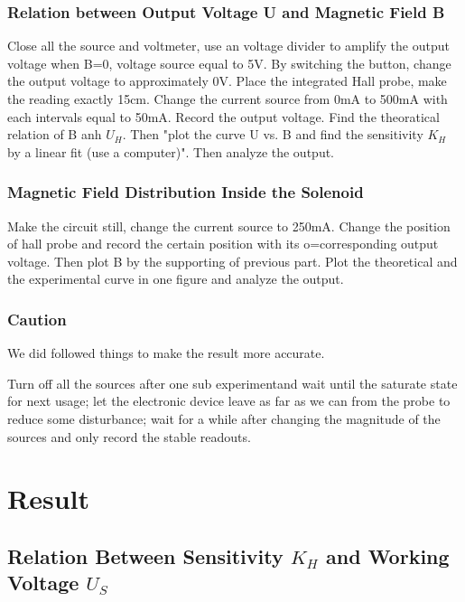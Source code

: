 \documentclass[12pt,a4paper]{article}
\begin{document}
\subsubsection{Relation between Output Voltage U and Magnetic Field B}
Close all the source and voltmeter, use an voltage divider to amplify the output voltage when B=0, voltage source equal to 5V. By switching the button, change the output voltage to approximately 0V. Place the integrated Hall probe, make the reading exactly 15cm. Change the current source from 0mA to 500mA with each intervals equal to 50mA. Record the output voltage. Find the theoratical relation of B anh $U_H$.  Then "plot the curve U vs. B and find the sensitivity $K_H$ by a linear fit (use a computer)". Then analyze the output.

\subsubsection{Magnetic Field Distribution Inside the Solenoid}
Make the circuit still, change the current source to 250mA. Change the position of hall probe and record the certain position with its o=corresponding output voltage. Then plot B by the supporting of previous part. Plot the theoretical and the experimental curve in one figure and analyze the output.

\subsubsection{Caution}
We did followed things to make the result more accurate.\par
Turn off all the sources after one sub experimentand wait until the saturate state for next usage; let the electronic device leave as far as we can from the probe to reduce some disturbance; wait for a while after changing the magnitude of the sources and only record the stable readouts.

\section{Result}
\subsection{Relation Between Sensitivity $K_H$ and Working Voltage $U_S$}
\end{document}
